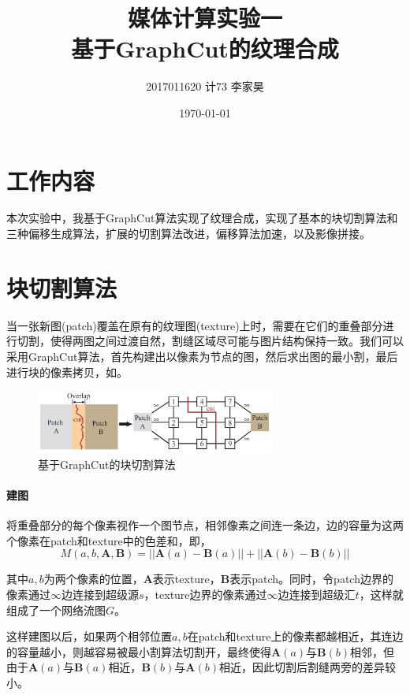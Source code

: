 \documentclass[11pt,a4paper]{article}
\title{媒体计算实验一\\基于GraphCut的纹理合成}
\author{2017011620 \quad 计73 \quad 李家昊}
\date{\today}
\begin{document}
\maketitle

\section{工作内容}

本次实验中，我基于GraphCut算法实现了纹理合成\cite{kwatra2003graphcut}，实现了基本的块切割算法和三种偏移生成算法，扩展的切割算法改进，偏移算法加速，以及影像拼接。

\section{块切割算法}

当一张新图(patch)覆盖在原有的纹理图(texture)上时，需要在它们的重叠部分进行切割，使得两图之间过渡自然，割缝区域尽可能与图片结构保持一致。我们可以采用GraphCut算法，首先构建出以像素为节点的图，然后求出图的最小割，最后进行块的像素拷贝，如。

\begin{figure}[H]
    \centering
    \includegraphics[width=0.7\textwidth]{fig/graphcut.jpg}
    \caption{基于GraphCut的块切割算法}
    \label{fig:graphcut}
\end{figure}

\paragraph{建图} 将重叠部分的每个像素视作一个图节点，相邻像素之间连一条边，边的容量为这两个像素在patch和texture中的色差和，即，
\begin{equation}\label{eq:energy}
    M(a,b,\mathbf{A},\mathbf{B}) = ||\mathbf{A}(a)-\mathbf{B}(a)|| + ||\mathbf{A}(b)-\mathbf{B}(b)||
\end{equation}

其中$a,b$为两个像素的位置，$\mathbf{A}$表示texture，$\mathbf{B}$表示patch。同时，令patch边界的像素通过$\infty$边连接到超级源$s$，texture边界的像素通过$\infty$边连接到超级汇$t$，这样就组成了一个网络流图$G$。

这样建图以后，如果两个相邻位置$a,b$在patch和texture上的像素都越相近，其连边的容量越小，则越容易被最小割算法切割开，最终使得$\mathbf{A}(a)$与$\mathbf{B}(b)$相邻，但由于$\mathbf{A}(a)$与$\mathbf{B}(a)$相近，$\mathbf{B}(b)$与$\mathbf{A}(b)$相近，因此切割后割缝两旁的差异较小。
\end{document}
